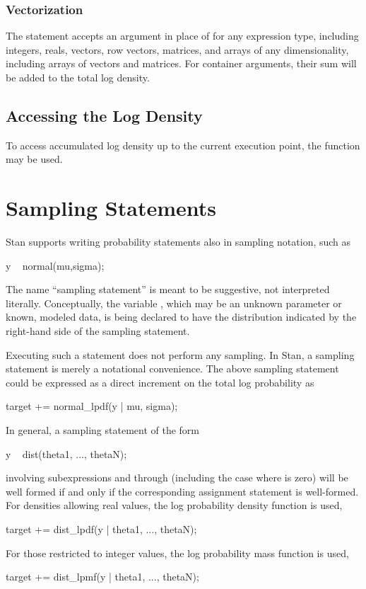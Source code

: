 \subsubsection{Vectorization}

The  statement accepts an argument in place of
 for any expression type, including integers, reals,
vectors, row vectors, matrices, and arrays of any dimensionality,
including arrays of vectors and matrices.   For container arguments,
their sum will be added to the total log density.

\subsection{Accessing the Log Density}

To access accumulated log density up to the current execution point,
the function  may be used.


\section{Sampling Statements}\label{sampling-statements.section}

Stan supports writing probability statements also in sampling
notation, such as
%
\begin{stancode}
y ~ normal(mu,sigma);
\end{stancode}
%
The name ``sampling statement'' is meant to be suggestive, not
interpreted literally.  Conceptually, the variable , which may
be an unknown parameter or known, modeled data, is being declared
to have the distribution indicated by the right-hand side of the
sampling statement.

Executing such a statement does not perform any sampling.  In Stan, a
sampling statement is merely a notational convenience.  The above
sampling statement could be expressed as a direct increment on the
total log probability as
%
\begin{stancode}
target += normal_lpdf(y | mu, sigma);
\end{stancode}

In general, a sampling statement of the form
%
\begin{stancode}
y ~ dist(theta1, ..., thetaN);
\end{stancode}
%
involving subexpressions  and  through
 (including the case where  is zero) will be well
formed if and only if the corresponding assignment statement is
well-formed.  For densities allowing real  values, the log
probability density function is used,
%
\begin{stancode}
target += dist_lpdf(y | theta1, ..., thetaN);
\end{stancode}
%
For those restricted to integer  values, the log probability
mass function is used,
%
\begin{stancode}
target += dist_lpmf(y | theta1, ..., thetaN);
\end{stancode}
%

